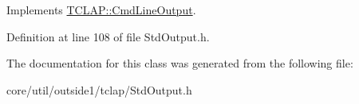 Implements \hyperlink{classTCLAP_1_1CmdLineOutput_ae052fea473132482296de55edb3dd480}{T\+C\+L\+A\+P\+::\+Cmd\+Line\+Output}.



Definition at line 108 of file Std\+Output.\+h.



The documentation for this class was generated from the following file\+:\begin{DoxyCompactItemize}
\item 
core/util/outside1/tclap/Std\+Output.\+h\end{DoxyCompactItemize}
